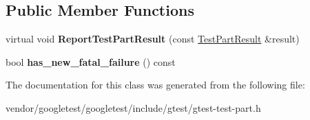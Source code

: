\subsection*{Public Member Functions}
\begin{DoxyCompactItemize}
\item 
virtual void {\bfseries Report\+Test\+Part\+Result} (const \hyperlink{classtesting_1_1TestPartResult}{Test\+Part\+Result} \&result)\hypertarget{classtesting_1_1internal_1_1HasNewFatalFailureHelper_ac7b5e77c9847b2b057cb97193ba82441}{}\label{classtesting_1_1internal_1_1HasNewFatalFailureHelper_ac7b5e77c9847b2b057cb97193ba82441}

\item 
bool {\bfseries has\+\_\+new\+\_\+fatal\+\_\+failure} () const \hypertarget{classtesting_1_1internal_1_1HasNewFatalFailureHelper_ae137e639098071f11f531bbd72dde1c7}{}\label{classtesting_1_1internal_1_1HasNewFatalFailureHelper_ae137e639098071f11f531bbd72dde1c7}

\end{DoxyCompactItemize}


The documentation for this class was generated from the following file\+:\begin{DoxyCompactItemize}
\item 
vendor/googletest/googletest/include/gtest/gtest-\/test-\/part.\+h\end{DoxyCompactItemize}
